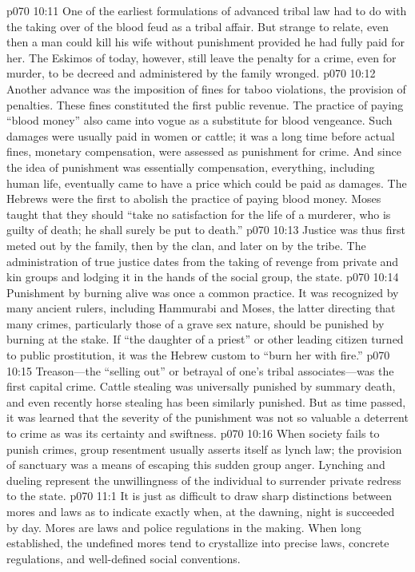 \vs p070 10:11 One of the earliest formulations of advanced tribal law had to do with the taking over of the blood feud as a tribal affair. But strange to relate, even then a man could kill his wife without punishment provided he had fully paid for her. The Eskimos of today, however, still leave the penalty for a crime, even for murder, to be decreed and administered by the family wronged.
\vs p070 10:12 Another advance was the imposition of fines for taboo violations, the provision of penalties. These fines constituted the first public revenue. The practice of paying “blood money” also came into vogue as a substitute for blood vengeance. Such damages were usually paid in women or cattle; it was a long time before actual fines, monetary compensation, were assessed as punishment for crime. And since the idea of punishment was essentially compensation, everything, including human life, eventually came to have a price which could be paid as damages. The Hebrews were the first to abolish the practice of paying blood money. Moses taught that they should “take no satisfaction for the life of a murderer, who is guilty of death; he shall surely be put to death.”
\pc \vs p070 10:13 Justice was thus first meted out by the family, then by the clan, and later on by the tribe. The administration of true justice dates from the taking of revenge from private and kin groups and lodging it in the hands of the social group, the state.\plusone
\pc \vs p070 10:14 Punishment by burning alive was once a common practice. It was recognized by many ancient rulers, including Hammurabi and Moses, the latter directing that many crimes, particularly those of a grave sex nature, should be punished by burning at the stake. If “the daughter of a priest” or other leading citizen turned to public prostitution, it was the Hebrew custom to “burn her with fire.”
\vs p070 10:15 Treason---the “selling out” or betrayal of one’s tribal associates---was the first capital crime. Cattle stealing was universally punished by summary death, and even recently horse stealing has been similarly punished. But as time passed, it was learned that the severity of the punishment was not so valuable a deterrent to crime as was its certainty and swiftness.
\vs p070 10:16 When society fails to punish crimes, group resentment usually asserts itself as lynch law; the provision of sanctuary was a means of escaping this sudden group anger. Lynching and dueling represent the unwillingness of the individual to surrender private redress to the state.
\vs p070 11:1 It is just as difficult to draw sharp distinctions between mores and laws as to indicate exactly when, at the dawning, night is succeeded by day. Mores are laws and police regulations in the making. When long established, the undefined mores tend to crystallize into precise laws, concrete regulations, and well\hyp{}defined social conventions.
